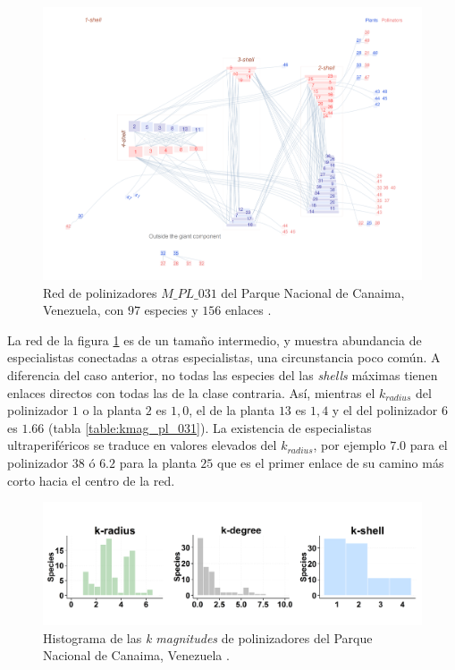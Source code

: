 \begin{figure}[h!]
\centering
\includegraphics[scale=0.14]{Figures/VIS_M_PL_031_ziggurat.png}
\caption {Red de polinizadores $M\_PL\_031$ del Parque Nacional de Canaima, Venezuela, con $97$ especies y $156$ enlaces \cite{ramirez1989biologia}.}
\label{fig:VIS_M_PL_031_ziggurat}
\end{figure}

La red de la figura \ref{fig:VIS_M_PL_031_ziggurat} es de un tamaño intermedio, y muestra abundancia de especialistas conectadas a otras especialistas, una circunstancia poco común. A diferencia del caso anterior, no todas las especies del las \textit{shells} máximas tienen enlaces directos con todas las de la clase contraria. Así, mientras el $k_{radius}$ del polinizador $1$ o la planta $2$ es $1,0$, el de la planta $13$ es $1,4$ y el del polinizador $6$ es $1.66$ (tabla \ref{table:kmag_pl_031}). La existencia de especialistas ultraperiféricos se traduce en valores elevados del $k_{radius}$, por ejemplo $7.0$ para el polinizador $38$ ó $6.2$ para la planta $25$ que es el primer enlace de su camino más corto hacia el centro de la red.

\begin{figure}[ht!]
\centering
\includegraphics[scale=0.45]{Figures/VIS_M_PL_031_polar.png}
\caption {Histograma de las \textit{k magnitudes} de polinizadores del Parque Nacional de Canaima, Venezuela \cite{ramirez1989biologia}.}
\label{fig:VIS_M_PL_031_polar}
\end{figure}

